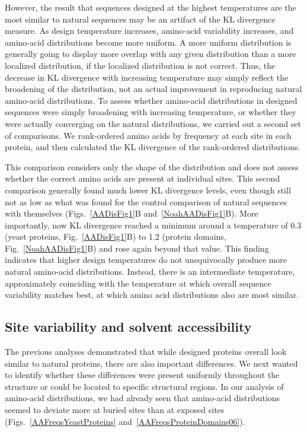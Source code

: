 \documentclass[12pt]{article}
\begin{document}
However, the result that sequences designed at the highest temperatures are the most similar to natural sequences may be an artifact of the KL divergence measure. As design temperature increases, amino-acid variability increases, and amino-acid distributions become more uniform. A more uniform distribution is generally going to display more overlap with any given distribution than a more localized distribution, if the localized distribution is not correct. Thus, the decrease in KL divergence with increasing temperature may simply reflect the broadening of the distribution, not an actual improvement in reproducing natural amino-acid distributions. To assess whether amino-acid distributions in designed sequences were simply broadening with increasing temperature, or whether they were actually converging on the natural distributions, we carried out a second set of comparisons. We rank-ordered amino acids by frequency at each site in each protein, and then calculated the KL divergence of the rank-ordered distributions. 

This comparison considers only the shape of the distribution and does not assess whether the correct amino acids are present at individual sites. This second comparison generally found much lower KL divergence levels, even though still not as low as what was found for the control comparison of natural sequences with themselves (Figs.~\ref{AADisFig1}B and~\ref{NoahAADisFig1}B). More importantly, now KL divergence reached a minimum around a temperature of 0.3 (yeast proteins, Fig.~\ref{AADisFig1}B) to 1.2 (protein domains, Fig.~\ref{NoahAADisFig1}B) and rose again beyond that value. This finding indicates that higher design temperatures do not unequivocally produce more natural amino-acid distributions. Instead, there is an intermediate temperature, approximately coinciding with the temperature at which overall sequence variability matches best, at which amino acid distributions also are most similar.

\subsection{Site variability and solvent accessibility}
\label{ProteinStructure}

The previous analyses demonstrated that while designed proteins overall look similar to natural proteins, there are also important differences. We next wanted to identify whether these differences were present uniformly throughout the structure or could be located to specific structural regions. In our analysis of amino-acid distributions, we had already seen that amino-acid distributions seemed to deviate more at buried sites than at exposed sites (Figs.~\ref{AAFreqsYeastProteins} and~\ref{AAFreqsProteinDomains06}).
\end{document}

